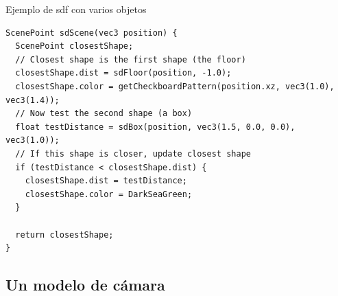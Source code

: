 \begin{frame}[fragile]{Ejemplo de sdf con varios objetos}
\begin{listing}
\begin{verbatim}
ScenePoint sdScene(vec3 position) {
  ScenePoint closestShape;
  // Closest shape is the first shape (the floor)
  closestShape.dist = sdFloor(position, -1.0);
  closestShape.color = getCheckboardPattern(position.xz, vec3(1.0), vec3(1.4));
  // Now test the second shape (a box)
  float testDistance = sdBox(position, vec3(1.5, 0.0, 0.0), vec3(1.0));
  // If this shape is closer, update closest shape
  if (testDistance < closestShape.dist) {
    closestShape.dist = testDistance;
    closestShape.color = DarkSeaGreen;
  }

  return closestShape;
}
\end{verbatim}
\end{listing}
\end{frame}

\subsection{Un modelo de cámara}

